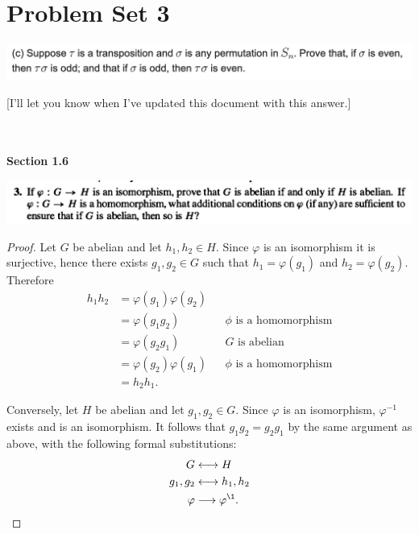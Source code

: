 
\section*{Problem  Set 3}


\begin{mdframed}
\includegraphics[width=400pt]{img/algebra--nf--2-179c.png}
\end{mdframed}

[I'll let you know when I've updated this document with this answer.]

~\\~\\
{\bf Section 1.6}\\

\begin{mdframed}
\includegraphics[width=400pt]{img/abstract-algebra--nf--3-4cd9.png}
\end{mdframed}

\begin{proof}
  Let $G$ be abelian and let $h_1, h_2 \in H$. Since $\varphi$ is an isomorphism it is surjective, hence
  there exists $g_1, g_2 \in G$ such that $h_1 = \varphi(g_1)$ and $h_2 = \varphi(g_2)$. Therefore
  \begin{align*}
    h_1h_2 &= \varphi(g_1)\varphi(g_2)\\
           &= \varphi(g_1g_2)       &&\text{$\phi$ is a homomorphism}\\
           &= \varphi(g_2g_1)       &&\text{$G$ is abelian }\\
           &= \varphi(g_2)\varphi(g_1)    &&\text{$\phi$ is a homomorphism}\\
           &= h_2h_1.
  \end{align*}

  Conversely, let $H$ be abelian and let $g_1, g_2 \in G$. Since $\varphi$ is an isomorphism,
  $\varphi^{-1}$ exists and is an isomorphism. It follows that $g_1g_2 = g_2g_1$ by the same argument as
  above, with the following formal substitutions:
  \begin{align*}
    G &\longleftrightarrow H \\
    g_1, g_2 &\longleftrightarrow h_1, h_2 \\
    \varphi &\longrightarrow \varphi^\1.
  \end{align*}
\end{proof}

